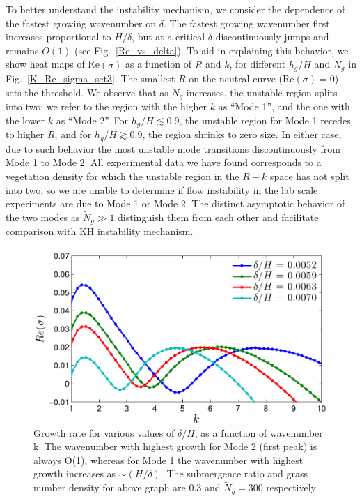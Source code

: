 \documentclass[12pt]{report}   %
\newcommand{\hg}{h_g}
\newcommand{\Rey}{{R}}
\newcommand{\Ndg}{\tilde{N}_g}
\begin{document}
To better understand the instability mechanism, we consider the dependence of the fastest growing wavenumber on $\delta$.
The fastest growing wavenumber first increases proportional to $H/\delta$, but at a critical $\delta$ discontinuously jumps and remains $O(1)$ (see Fig.~\ref{Re_vs_delta}). 
To aid in explaining this behavior, we show heat maps of Re$(\sigma)$ as a function of $\Rey$ and $k$, for different $\hg/H$ and $\Ndg$ in Fig.~\ref{K_Re_sigma_set3}. 
The smallest $\Rey$ on the neutral curve (Re$(\sigma)=0$) sets the threshold. 
We observe that as $\Ndg$ increases, the unstable region splits into two; we refer to the region with the higher $k$ as ``Mode 1'', and the one with the lower $k$ as ``Mode 2''. 
For $\hg/H\lesssim 0.9$, the unstable region for Mode 1 recedes to higher $\Rey$, and for $\hg/H \gtrsim 0.9$, the region shrinks to zero size.
In either case, due to such behavior the most unstable mode transitions discontinuously from Mode 1 to Mode 2.
All experimental data we have found corresponds to a vegetation density for which the unstable region in the $\Rey-k$ space has not split into two, so we are unable to determine if flow instability in the lab scale experiments \citep{Nepf04} are due to Mode 1 or Mode 2.
The distinct asymptotic behavior of the two modes as $\Ndg \gg 1$ distinguish them from each other and facilitate comparison with KH instability mechanism.
\begin{figure}
 \includegraphics{K_vs_GrowthSet3}
 \caption{Growth rate for various values of $\delta/H$, as a function of wavenumber k. The wavenumber with highest growth for Mode 2 (first peak) is always O(1), whereas for Mode 1 the wavenumber with highest growth increases as $\sim (H/\delta)$. The submergence ratio and grass number density for above graph are $0.3$ and $\Ndg = 300$ respectively  }
 \label{K_vs_SigmaSet3}
\end{figure}
\end{document}
